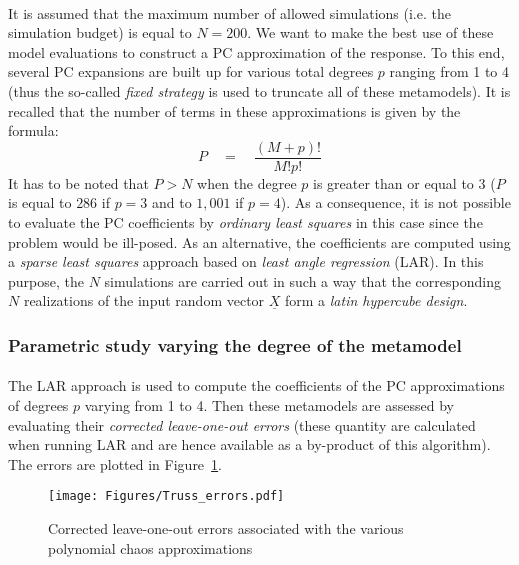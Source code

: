 \documentclass[11pt]{article}
\begin{document}
\paragraph{}
It is assumed that the maximum number of allowed simulations (i.e. the simulation budget) is equal to $N=200$. We want to make the best use of these model evaluations to construct a PC approximation of the response. To this end, several PC expansions are built up for various total degrees $p$ ranging from 1 to 4 (thus the so-called \emph{fixed strategy} is used to truncate all of these metamodels). It is recalled that the number of terms in these approximations is given by the formula:
\begin{equation}
  P \quad = \quad \frac{(M+p)!}{M!p!}
\end{equation}
It has to be noted that $P>N$ when the degree $p$ is greater than or equal to 3 ($P$ is equal to $286$ if $p=3$ and to $1,001$ if $p=4$). As a consequence, it is not possible to evaluate the PC coefficients by \emph{ordinary least squares} in this case since the problem would be ill-posed. As an alternative, the coefficients are computed using a \emph{sparse least squares} approach based on \emph{least angle regression} (LAR). In this purpose, the $N$ simulations are carried out in such a way that the corresponding $N$ realizations of the input random vector $\underline{X}$ form a \emph{latin hypercube design}.

\subsubsection{Parametric study varying the degree of the metamodel}

\paragraph{}
The LAR approach is used to compute the coefficients of the PC approximations of degrees $p$ varying from 1 to 4. Then these metamodels are assessed by evaluating their \emph{corrected leave-one-out errors} (these quantity are calculated when running LAR and are hence available as a by-product of this algorithm). The errors are plotted in Figure~\ref{fig_errors}.

\begin{figure}[Hhbtp]
  \begin{center}
    \texttt{[image: Figures/Truss\_errors.pdf]}
  \end{center}
  \caption{Corrected leave-one-out errors associated with the various polynomial chaos approximations}
  \label{fig_errors}
\end{figure}
\end{document}
